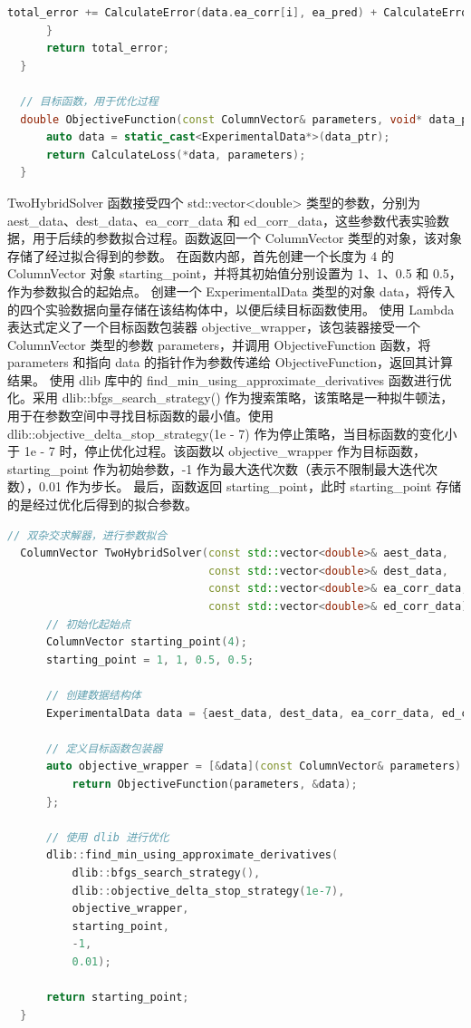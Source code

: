 \begin{enumerate}
\begin{lstlisting}[language=C++]
          total_error += CalculateError(data.ea_corr[i], ea_pred) + CalculateError(data.ed_corr[i], ed_pred);
      }
      return total_error;
  }
  
  // 目标函数，用于优化过程
  double ObjectiveFunction(const ColumnVector& parameters, void* data_ptr) {
      auto data = static_cast<ExperimentalData*>(data_ptr);
      return CalculateLoss(*data, parameters);
  }
  \end{lstlisting}
  
  {TwoHybridSolver} 函数接受四个 std::vector<double> 类型的参数，分别为 {aest\_data}、{dest\_data}、{ea\_corr\_data} 和 {ed\_corr\_data}，这些参数代表实验数据，用于后续的参数拟合过程。函数返回一个 {ColumnVector} 类型的对象，该对象存储了经过拟合得到的参数。
  在函数内部，首先创建一个长度为 4 的 {ColumnVector} 对象 {starting\_point}，并将其初始值分别设置为 1、1、0.5 和 0.5，作为参数拟合的起始点。
  创建一个 {ExperimentalData} 类型的对象 {data}，将传入的四个实验数据向量存储在该结构体中，以便后续目标函数使用。
  使用 Lambda 表达式定义了一个目标函数包装器 {objective\_wrapper}，该包装器接受一个 {ColumnVector} 类型的参数 {parameters}，并调用 {ObjectiveFunction} 函数，将 {parameters} 和指向 {data} 的指针作为参数传递给 {ObjectiveFunction}，返回其计算结果。
  使用 {dlib} 库中的 {find\_min\_using\_approximate\_derivatives} 函数进行优化。采用 {dlib::bfgs\_search\_strategy()} 作为搜索策略，该策略是一种拟牛顿法，用于在参数空间中寻找目标函数的最小值。使用 {dlib::objective\_delta\_stop\_strategy(1e - 7)} 作为停止策略，当目标函数的变化小于 {1e - 7} 时，停止优化过程。该函数以 {objective\_wrapper} 作为目标函数，{starting\_point} 作为初始参数，{-1} 作为最大迭代次数（表示不限制最大迭代次数），{0.01} 作为步长。
  最后，函数返回 {starting\_point}，此时 {starting\_point} 存储的是经过优化后得到的拟合参数。
  
  \begin{lstlisting}[language=C++]
  // 双杂交求解器，进行参数拟合
  ColumnVector TwoHybridSolver(const std::vector<double>& aest_data,
                               const std::vector<double>& dest_data,
                               const std::vector<double>& ea_corr_data,
                               const std::vector<double>& ed_corr_data) {
      // 初始化起始点
      ColumnVector starting_point(4);
      starting_point = 1, 1, 0.5, 0.5;
  
      // 创建数据结构体
      ExperimentalData data = {aest_data, dest_data, ea_corr_data, ed_corr_data};
  
      // 定义目标函数包装器
      auto objective_wrapper = [&data](const ColumnVector& parameters) {
          return ObjectiveFunction(parameters, &data);
      };
  
      // 使用 dlib 进行优化
      dlib::find_min_using_approximate_derivatives(
          dlib::bfgs_search_strategy(),
          dlib::objective_delta_stop_strategy(1e-7),
          objective_wrapper,
          starting_point,
          -1,
          0.01);

      return starting_point;
  }
  \end{lstlisting}
\end{enumerate}

